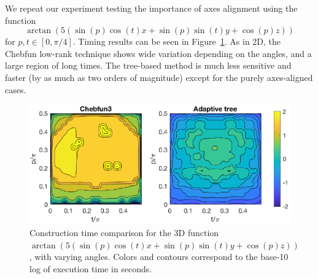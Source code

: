 
We repeat our experiment testing the importance of axes alignment using the function
\begin{equation}
\arctan(5(\sin(p)\cos(t)x+\sin(p)\sin(t)y+\cos(p)z))
\end{equation}
for $p,t \in [0,\pi/4]$. Timing results can be seen in Figure~\ref{fig:tan3D}. As in 2D, the Chebfun low-rank technique shows wide variation depending on the angles, and a large region of long times. The tree-based method is much less sensitive and faster (by as much as two orders of magnitude) except for the purely axes-aligned cases. 

\begin{figure}
  \centering
  \includegraphics[width=\textwidth]{Chapter2/tan3d_comparison}
  \caption{Construction time comparison for the 3D function $\arctan(5(\sin(p)\cos(t)x+\sin(p)\sin(t)y+\cos(p)z))$, with varying angles. Colors and contours correspond to the base-10 log of execution time in seconds.}
  \label{fig:tan3D}
\end{figure}

